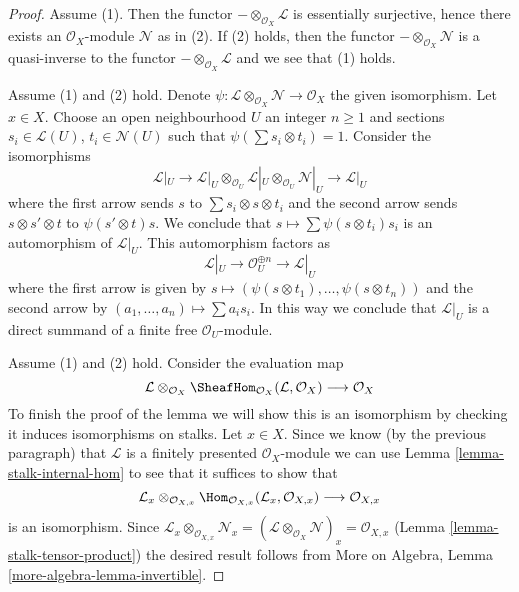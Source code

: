 \begin{proof}
Assume (1). Then the functor $- \otimes_{\mathcal{O}_X} \mathcal{L}$
is essentially surjective, hence there exists an $\mathcal{O}_X$-module
$\mathcal{N}$ as in (2). If (2) holds, then the functor
$- \otimes_{\mathcal{O}_X} \mathcal{N}$ is a quasi-inverse
to the functor $- \otimes_{\mathcal{O}_X} \mathcal{L}$ and
we see that (1) holds.

\medskip\noindent
Assume (1) and (2) hold. Denote
$\psi : \mathcal{L} \otimes_{\mathcal{O}_X} \mathcal{N} \to \mathcal{O}_X$
the given isomorphism. Let $x \in X$. Choose an open neighbourhood
$U$ an integer $n \geq 1$ and sections $s_i \in \mathcal{L}(U)$,
$t_i \in \mathcal{N}(U)$ such that $\psi(\sum s_i \otimes t_i) = 1$.
Consider the isomorphisms
$$
\mathcal{L}|_U \to
\mathcal{L}|_U \otimes_{\mathcal{O}_U}
\mathcal{L}|_U \otimes_{\mathcal{O}_U} \mathcal{N}|_U \to \mathcal{L}|_U
$$
where the first arrow sends $s$ to $\sum s_i \otimes s \otimes t_i$
and the second arrow sends $s \otimes s' \otimes t$ to $\psi(s' \otimes t)s$.
We conclude that $s \mapsto \sum \psi(s \otimes t_i)s_i$ is
an automorphism of $\mathcal{L}|_U$. This automorphism factors as
$$
\mathcal{L}|_U \to \mathcal{O}_U^{\oplus n} \to \mathcal{L}|_U
$$
where the first arrow is given by
$s \mapsto (\psi(s \otimes t_1), \ldots, \psi(s \otimes t_n))$
and the second arrow by $(a_1, \ldots, a_n) \mapsto \sum a_i s_i$.
In this way we conclude that $\mathcal{L}|_U$ is a direct summand
of a finite free $\mathcal{O}_U$-module.

\medskip\noindent
Assume (1) and (2) hold. Consider the evaluation map
$$
\mathcal{L} \otimes_{\mathcal{O}_X}
\SheafHom_{\mathcal{O}_X}(\mathcal{L}, \mathcal{O}_X)
\longrightarrow \mathcal{O}_X
$$
To finish the proof of the lemma
we will show this is an isomorphism by checking it induces
isomorphisms on stalks. Let $x \in X$.
Since we know (by the previous paragraph)
that $\mathcal{L}$ is a finitely presented
$\mathcal{O}_X$-module
we can use Lemma \ref{lemma-stalk-internal-hom}
to see that it suffices to show that
$$
\mathcal{L}_x \otimes_{\mathcal{O}_{X, x}}
\Hom_{\mathcal{O}_{X, x}}(\mathcal{L}_x, \mathcal{O}_{X, x})
\longrightarrow \mathcal{O}_{X, x}
$$
is an isomorphism. Since
$\mathcal{L}_x \otimes_{\mathcal{O}_{X, x}} \mathcal{N}_x =
(\mathcal{L} \otimes_{\mathcal{O}_X} \mathcal{N})_x =
\mathcal{O}_{X, x}$ (Lemma \ref{lemma-stalk-tensor-product})
the desired result follows from
More on Algebra, Lemma \ref{more-algebra-lemma-invertible}.
\end{proof}

